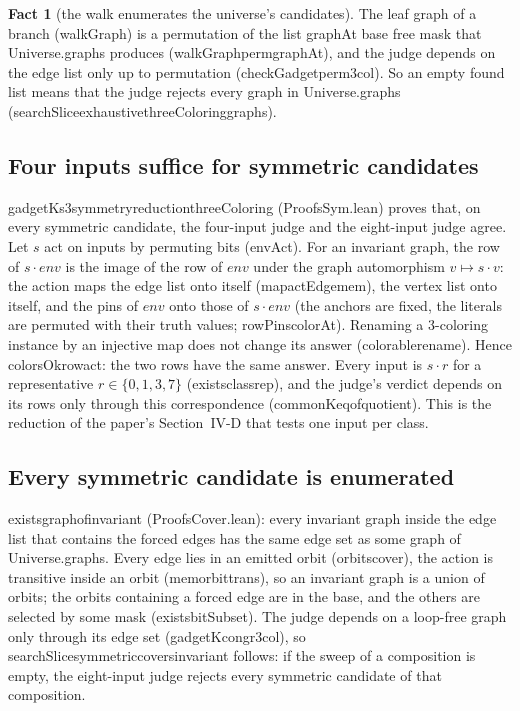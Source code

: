 \documentclass[11pt,a4paper]{article}
\newcommand{\leanus}{\textunderscore\allowbreak}
\newcommand{\lean}[1]{{\ttfamily\let\_\leanus #1}}
\theoremstyle{definition}
\newtheorem{fact}{Fact}
\begin{document}
\begin{fact}[the walk enumerates the universe's candidates]
The leaf graph of a branch (\lean{walkGraph}) is a permutation of the list
\lean{graphAt base free mask} that \lean{Universe.graphs} produces
(\lean{walkGraph\_perm\_graphAt}), and the judge depends on the edge list
only up to permutation (\lean{checkGadget\_perm\_3col}). So an empty
\lean{found} list means that the judge rejects every graph in
\lean{Universe.graphs}
(\lean{searchSlice\_exhaustive\_threeColoring\_graphs}).
\end{fact}

\subsection{Four inputs suffice for symmetric candidates}\label{sec:symred}
\lean{gadgetK\_s3\_symmetry\_reduction\_threeColoring}
(\lean{ProofsSym.lean}) proves that, on every symmetric candidate, the
four-input judge and the eight-input judge agree. Let $s$ act on inputs by
permuting bits (\lean{envAct}). For an invariant graph, the row of
$s\cdot\mathit{env}$ is the image of the row of $\mathit{env}$ under the
graph automorphism $v\mapsto s\cdot v$: the action maps the edge list onto
itself (\lean{map\_actEdge\_mem}), the vertex list onto itself, and the pins
of $\mathit{env}$ onto those of $s\cdot\mathit{env}$ (the anchors are fixed,
the literals are permuted with their truth values; \lean{rowPins\_colorAt}).
Renaming a 3-coloring instance by an injective map does not change its answer
(\lean{colorable\_rename}). Hence \lean{colorsOk\_row\_act}: the two rows have
the same answer. Every input is $s\cdot r$ for a representative
$r\in\{0,1,3,7\}$ (\lean{exists\_class\_rep}), and the judge's verdict
depends on its rows only through this correspondence
(\lean{commonK\_eq\_of\_quotient}). This is the reduction of the paper's
Section~IV-D that tests one input per class.

\subsection{Every symmetric candidate is enumerated}\label{sec:cover}
\lean{exists\_graph\_of\_invariant} (\lean{ProofsCover.lean}): every
invariant graph inside the edge list that contains the forced edges has the
same edge set as some graph of \lean{Universe.graphs}. Every edge lies in an
emitted orbit (\lean{orbits\_cover}), the action is transitive inside an
orbit (\lean{mem\_orbit\_trans}), so an invariant graph is a union of
orbits; the orbits containing a forced edge are in the base, and the others
are selected by some mask (\lean{exists\_bitSubset}). The judge depends on a
loop-free graph only through its edge set (\lean{gadgetK\_congr\_3col}), so
\lean{searchSlice\_symmetric\_covers\_invariant} follows: if the sweep of a
composition is empty, the eight-input judge rejects every symmetric
candidate of that composition.
\end{document}
